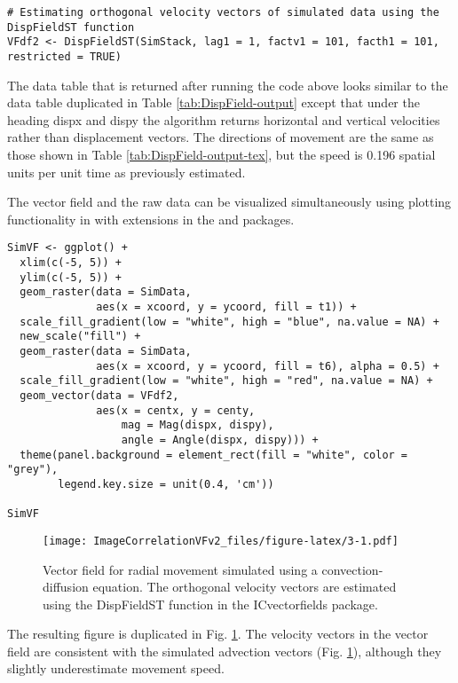 \begin{verbatim}
# Estimating orthogonal velocity vectors of simulated data using the DispFieldST function
VFdf2 <- DispFieldST(SimStack, lag1 = 1, factv1 = 101, facth1 = 101, restricted = TRUE)
\end{verbatim}

The data table that is returned after running the code above looks similar to the data table duplicated in Table \ref{tab:DispField-output} except that under the heading dispx and dispy the algorithm returns horizontal and vertical velocities rather than displacement vectors. The directions of movement are the same as those shown in Table \ref{tab:DispField-output-tex}, but the speed is 0.196 spatial units per unit time as previously estimated.

The vector field and the raw data can be visualized simultaneously using plotting functionality in  with extensions in the  and  packages.

\begin{verbatim}
SimVF <- ggplot() +
  xlim(c(-5, 5)) +
  ylim(c(-5, 5)) +
  geom_raster(data = SimData,
              aes(x = xcoord, y = ycoord, fill = t1)) +
  scale_fill_gradient(low = "white", high = "blue", na.value = NA) +
  new_scale("fill") +
  geom_raster(data = SimData,
              aes(x = xcoord, y = ycoord, fill = t6), alpha = 0.5) +
  scale_fill_gradient(low = "white", high = "red", na.value = NA) +
  geom_vector(data = VFdf2, 
              aes(x = centx, y = centy, 
                  mag = Mag(dispx, dispy), 
                  angle = Angle(dispx, dispy))) + 
  theme(panel.background = element_rect(fill = "white", color = "grey"),
        legend.key.size = unit(0.4, 'cm'))

SimVF
\end{verbatim}

\begin{figure}
\centering
\texttt{[image: ImageCorrelationVFv2\_files/figure-latex/3-1.pdf]}
\caption{\label{fig:3}Vector field for radial movement simulated using a convection-diffusion equation. The orthogonal velocity vectors are estimated using the DispFieldST function in the ICvectorfields package.}
\end{figure}

The resulting figure is duplicated in Fig. \ref{fig:3}. The velocity vectors in the vector field are consistent with the simulated advection vectors (Fig. \ref{fig:3}), although they slightly underestimate movement speed.

